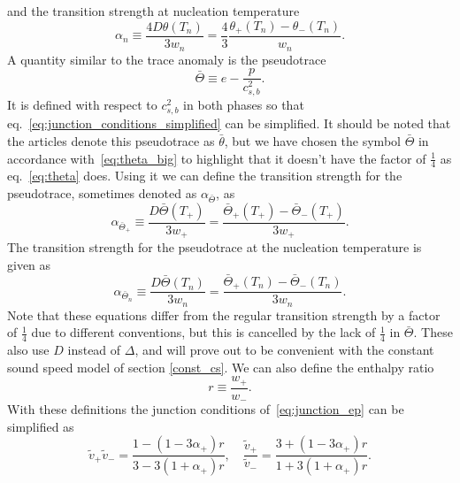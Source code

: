 and the transition strength at nucleation temperature
\cite[eq. 2.11]{hindmarsh_gw_pt_2019}
\begin{equation}
\alpha_n
\equiv \frac{4D\theta(T_n)}{3w_n}
= \frac{4}{3} \frac{\theta_+(T_n) - \theta_-(T_n)}{w_n}.
\label{eq:alpha_n}
\end{equation}
A quantity similar to the trace anomaly is the pseudotrace
\cites[eq. 34]{giese_2020}[eq. 1]{giese_2021}
\begin{equation}
\bar{\Theta} \equiv e - \frac{p}{c_{s,b}^2}.
\label{eq:theta_bar}
\end{equation}
It is defined with respect to $c_{s,b}^2$ in both phases so that eq.~\eqref{eq:junction_conditions_simplified} can be simplified.
It should be noted that the articles \cites{giese_2020}{giese_2021} denote this pseudotrace as $\bar{\theta}$,
but we have chosen the symbol $\bar{\Theta}$ in accordance with~\eqref{eq:theta_big} to highlight that it doesn't have the factor of $\frac{1}{4}$ as eq.~\eqref{eq:theta} does.
Using it we can define the transition strength for the pseudotrace,
sometimes denoted as $\alpha_{\bar{\Theta}}$, as
\cites[eq. 34]{giese_2020}[eq. 1]{giese_2021}
\begin{equation}
\alpha_{\bar{\Theta}_+}
\equiv \frac{D \bar{\Theta}(T_+)}{3w_+}
= \frac{\bar{\Theta}_+(T_+) - \bar{\Theta}_-(T_+)}{3w_+}.
\label{eq:alpha_theta_bar_plus}
\end{equation}
The transition strength for the pseudotrace at the nucleation temperature is given as
\begin{equation}
\alpha_{\bar{\Theta}_n}
\equiv \frac{D \bar{\Theta}(T_n)}{3w_n}
= \frac{\bar{\Theta}_+(T_n) - \bar{\Theta}_-(T_n)}{3w_n}.
\label{eq:alpha_theta_bar_n}
\end{equation}
Note that these equations differ from the regular transition strength by a factor of $\frac{1}{4}$ due to different conventions,
but this is cancelled by the lack of $\frac{1}{4}$ in $\bar{\Theta}$.
These also use $D$ instead of $\Delta$,
and will prove out to be convenient with the constant sound speed model of section \ref{const_cs}.
We can also define the enthalpy ratio
\begin{equation}
r \equiv \frac{w_+}{w_-}.
\end{equation}
With these definitions the junction conditions of~\eqref{eq:junction_ep} can be simplified as
\begin{equation}
\tilde{v}_+ \tilde{v}_- = \frac{1-(1-3\alpha_+)r}{3-3(1+\alpha_+)r},
\quad
\frac{\tilde{v}_+}{\tilde{v}_-} = \frac{3+(1-3\alpha_+)r}{1+3(1+\alpha_+)r}.
\label{eq:junction_conditions_simplified}
\end{equation}
